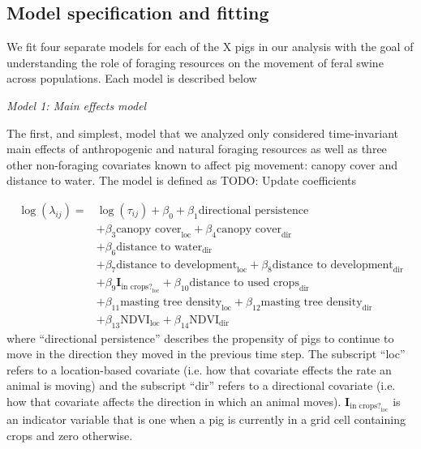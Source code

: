 \documentclass[a4paper]{article}
\begin{document}
\subsection*{Model specification and fitting}

We fit four separate models for each of the X pigs in our analysis with the goal of understanding the role of foraging resources on the movement of feral swine across populations.  Each model is described below

\bigskip
\noindent
\emph{Model 1: Main effects model}

The first, and simplest, model that we analyzed only considered time-invariant main effects of anthropogenic and natural foraging resources as well as three other non-foraging covariates known to affect pig movement: canopy cover and distance to water.  The model is defined as TODO: Update coefficients

\begin{align}
  \log(\lambda_{ij}) = & \log(\tau_{ij}) + \beta_0 +  \beta_1 \text{directional persistence}  \\
  & + \beta_{3} \text{canopy cover}_{\text{loc}} + \beta_{4} \text{canopy cover}_{\text{dir}} \\
  & + \beta_6 \text{distance to water}_{\text{dir}} \\
  & + \beta_7 \text{distance to development}_{\text{loc}} + \beta_8 \text{distance to development}_{\text{dir}} \\
  & + \beta_9\mathbf{I}_{\text{in crops?}_{\text{loc}}} + \beta_{10}\text{distance to used crops}_{\text{dir}} \\
  & + \beta_{11}\text{masting tree density}_{\text{loc}} + \beta_{12}\text{masting tree density}_{\text{dir}} \\
  & + \beta_{13}\text{NDVI}_{\text{loc}} + \beta_{14}\text{NDVI}_{\text{dir}}
\end{align}
where ``directional persistence'' describes the propensity of pigs to continue to move in the direction they moved in the previous time step.  The subscript ``loc'' refers to a location-based covariate (i.e. how that covariate effects the rate an animal is moving) and the subscript ``dir'' refers to a directional covariate (i.e. how that covariate affects the direction in which an animal moves). $\mathbf{I}_{\text{in crops?}_{\text{loc}}}$ is an indicator variable that is one when a pig is currently in a grid cell containing crops and zero otherwise.
\end{document}
